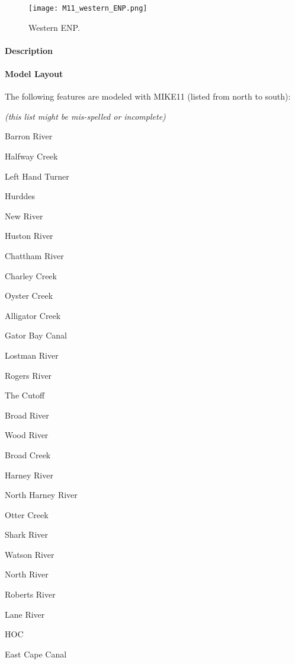 \begin{figure}[!h]
  \begin{center}
  \texttt{[image: M11\_western\_ENP.png]}
  \caption{Western ENP.}
  \label{fig:M11_western_ENP}
  \end{center}
\end{figure}

\clearpage

\paragraph{Description}

\paragraph{Model Layout}
The following features are modeled with MIKE11 (listed from north to south):
\begin{packed_items}
\item \emph{(this list might be mis-spelled or incomplete)}
\item Barron River
\item Halfway Creek
\item Left Hand Turner
\item Hurddes
\item New River
\item Huston River
\item Chattham River
\item Charley Creek
\item Oyster Creek
\item Alligator Creek
\item Gator Bay Canal
\item Lostman River
\item Rogers River
\item The Cutoff
\item Broad River
\item Wood River
\item Broad Creek
\item Harney River
\item North Harney River
\item Otter Creek
\item Shark River
\item Watson River
\item North River
\item Roberts River
\item Lane River
\item HOC
\item East Cape Canal
\end{packed_items}

